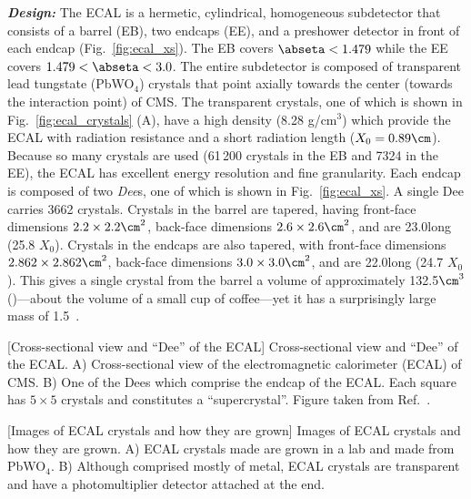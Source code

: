 \textit{\textbf{Design:}}
The ECAL is a hermetic, cylindrical, homogeneous subdetector that consists of a barrel (EB), two endcaps (EE), and a preshower detector in front of each endcap (Fig.~\ref{fig:ecal_xs}).
The EB covers $\abseta < 1.479$ while the EE covers $1.479 < \abseta < 3.0$.
The entire subdetector is composed of transparent lead tungstate (PbWO$_4$) crystals that point axially towards the center (\ie towards the interaction point) of CMS.
The transparent crystals, one of which is shown in Fig.~\ref{fig:ecal_crystals} (A), have a high density (8.28 g/cm$^3$) which provide the ECAL with radiation resistance and a short radiation length ($X_0 = 0.89\cm$).
Because so many crystals are used (61\,200 crystals in the EB and 7324 in the EE), the ECAL has excellent energy resolution and fine granularity.
Each endcap is composed of two \emph{Dee}s, one of which is shown in Fig.~\ref{fig:ecal_xs}.
A single Dee carries 3662 crystals.
Crystals in the barrel are tapered, having front-face dimensions $2.2 \times 2.2\cm^2$, back-face dimensions $2.6 \times 2.6\cm^2$, and are 23.0\cm long (25.8 $X_0$).
Crystals in the endcaps are also tapered, with front-face dimensions $2.862 \times 2.862\cm^2$, back-face dimensions $3.0 \times 3.0\cm^2$, and are 22.0\cm long (24.7 $X_0$).
This gives a single crystal from the barrel a volume of approximately 132.5$\cm^3$ (\mL)---about the volume of a small cup of coffee---yet it has a surprisingly large mass of 1.5\Kg~\cite{particle_data_group_review_2020}.
\begin{multiFigure}
    \centering
        [Cross-sectional view and ``Dee'' of the ECAL]
        {Cross-sectional view and ``Dee'' of the ECAL.
        \;A) Cross-sectional view of the electromagnetic calorimeter (ECAL) of CMS.
        \;B) One of the Dees which comprise the endcap of the ECAL.
        Each square has $5 \times 5$ crystals and constitutes a ``supercrystal''.
        Figure taken from Ref.~\cite{collaboration_cms_2008}.
        }
    \label{fig:ecal_xs}
\end{multiFigure}
\begin{multiFigure}
    \centering
        [Images of ECAL crystals and how they are grown]
        {Images of ECAL crystals and how they are grown.
        \;A) ECAL crystals made are grown in a lab and made from PbWO$_4$.
        \;B) Although comprised mostly of metal, ECAL crystals are transparent and have a photomultiplier detector attached at the end.
        } 
    \label{fig:ecal_crystals}
\end{multiFigure}

